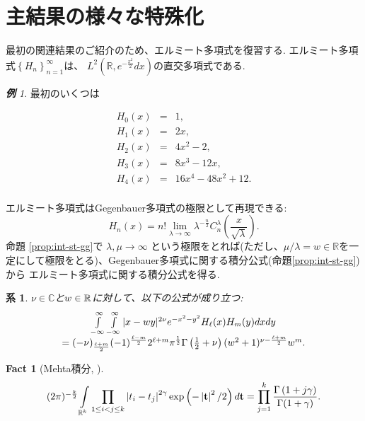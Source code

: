 \documentclass[12pt]{article} %
\newtheorem{cor}{系}
\newtheorem*{fact*}{Fact}
\theoremstyle{remark}
\newtheorem*{example*}{\textbf{例}}
\begin{document}
\section{主結果の様々な特殊化}
最初の関連結果のご紹介のため、エルミート多項式を復習する.
エルミート多項式$\left\{ H_n \right\}_{n=1}^\infty$は、
	$L^2\left( \mathbb{R},e^{-\frac{x^2}{2}}dx \right)$の直交多項式である.
	\begin{example*}
		最初のいくつは
	
		\begin{eqnarray*}
		H_0(x)&=& 1,\\
		H_1(x)&=& 2x,\\
		H_2(x)&=& 
		4x^2-2,\\
		H_3(x)&=& 8x^3-12x,\\
		H_4(x)&=& 16x^4-48x^2+12.\\
		\end{eqnarray*}
	\end{example*}
	エルミート多項式はGegenbauer多項式の極限として再現できる:
	\begin{equation*}
			H_n (x) = n! \lim_{\lambda \rightarrow \infty} \lambda^{- \frac{n}{2}}
			C_n^{\lambda} \left( \frac{x}{\sqrt{\lambda}} \right).
	\end{equation*}
	命題 \ref{prop:int-st-gg}で $\lambda,\mu\to\infty$ 
	という極限をとれば(ただし、$\mu/\lambda=w\in\mathbb{R}$を一定にして極限をとる)、Gegenbauer多項式に関する積分公式(命題\ref{prop:int-st-gg})から
	エルミート多項式に関する積分公式を得る.
	\begin{cor}\label{cor:int-xzy-hh}
		$\nu\in\mathbb{C}$と$w\in\mathbb{R}$に対して、以下の公式が成り立つ:
		\begin{equation*}
			\begin{array}[]{c}
			\int_{- \infty}^{\infty} \int_{- \infty}^{\infty} | x - w y |^{2 \nu} e^{-
			x^2 - y^2} H_\ell (x) H_m (y) d x d y \\= (- \nu)_{\frac{\ell + m}{2}} (- 1)^{\frac{\ell
			- m}{2}} 2^{\ell + m} \pi^{\frac{1}{2}} \Gamma \left( \frac{1}{2} + \nu \right)
			(w^2 + 1)^{\nu - \frac{\ell + m}{2}} w^m .
			\end{array}
		\end{equation*}
	\end{cor}
	\begin{fact*}[Mehta積分, {\cite{mehta2004random}}]
			{
		\begin{equation*}
			\begin{array}[]{c}
			{(2\pi)^{-\frac{k}{2}}}\displaystyle\int_{\mathbb{R}^k}\prod_{1\le i<j\le k}\myabs{t_i-t_j}^{2\gamma}\exp\left( -\myabs{\mathbf{t}}^2/2 \right)d\mathbf{t}
			=\displaystyle\prod_{j=1}^k\frac{\Gamma\left( 
			1+j\gamma\right)}{\Gamma(1+\gamma)}.
			\end{array}
		\end{equation*}
	}
		\end{fact*}
\end{document}
